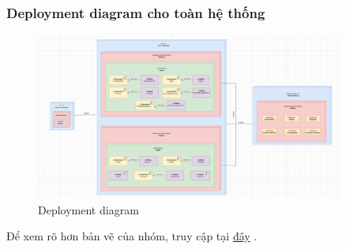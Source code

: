 \subsubsection{Deployment diagram cho toàn hệ thống}
\begin{figure}[H]
    \begin{center}
\includegraphics[width=0.9\textwidth]{Images/Box-line + Deployment/deployment.jpg}
        \caption{Deployment diagram}
    \end{center}
\end{figure}
Để xem rõ hơn bản vẽ của nhóm, truy cập tại \href{https://drive.google.com/file/d/1t1EVsOUQxixdM85v2Ch99MjhRM3ihQc9/view?usp=sharing}{đây} .
